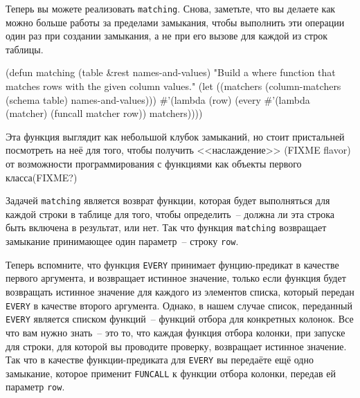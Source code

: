 Теперь вы можете реализовать \lstinline{matching}.  Снова, заметьте, что вы делаете как можно
больше работы за пределами замыкания, чтобы выполнить эти операции один раз при создании
замыкания, а не при его вызове для каждой из строк таблицы.

\begin{myverb}
(defun matching (table &rest names-and-values)
  "Build a where function that matches rows with the given column values."
  (let ((matchers (column-matchers (schema table) names-and-values)))
    #'(lambda (row)
        (every #'(lambda (matcher) (funcall matcher row)) matchers))))
\end{myverb}

Эта функция выглядит как небольшой клубок замыканий, но стоит пристальней посмотреть на
неё для того, чтобы получить <<наслаждение>> (FIXME flavor) от возможности программирования
с функциями как объекты первого класса(FIXME?)

Задачей \lstinline{matching} является возврат функции, которая будет выполняться для каждой
строки в таблице для того, чтобы определить~-- должна ли эта строка быть включена в
результат, или нет.  Так что функция \lstinline{matching} возвращает замыкание принимающее один
параметр~-- строку \lstinline{row}.

Теперь вспомните, что функция \lstinline{EVERY} принимает фунцию-предикат в качестве первого
аргумента, и возвращает истинное значение, только если функция будет возвращать истинное
значение для каждого из элементов списка, который передан \lstinline{EVERY} в качестве второго
аргумента.  Однако, в нашем случае список, переданный \lstinline{EVERY} является списком
функций~-- функций отбора для конкретных колонок.  Все что вам нужно знать~-- это то,
что каждая функция отбора колонки, при запуске для строки, для которой вы проводите
проверку, возвращает истинное значение.  Так что в качестве функции-предиката для
\lstinline{EVERY} вы передаёте ещё одно замыкание, которое применит \lstinline{FUNCALL} к функции
отбора колонки, передав ей параметр \lstinline{row}.

